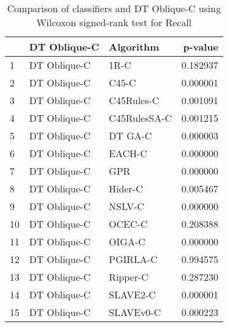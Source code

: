 \begin{table}
\footnotesize
\caption{Comparison of classifiers and DT Oblique-C using Wilcoxon signed-rank test for Recall}
\label{tab:DT Oblique-C wilcoxon Recall comparison}
\begin{tabular}{lllr}
\hline
 & DT Oblique-C & Algorithm & p-value \\
\hline
1 & DT Oblique-C & 1R-C & 0.182937 \\
2 & DT Oblique-C & C45-C & 0.000001 \\
3 & DT Oblique-C & C45Rules-C & 0.001091 \\
4 & DT Oblique-C & C45RulesSA-C & 0.001215 \\
5 & DT Oblique-C & DT GA-C & 0.000003 \\
6 & DT Oblique-C & EACH-C & 0.000000 \\
7 & DT Oblique-C & GPR & 0.000000 \\
8 & DT Oblique-C & Hider-C & 0.005467 \\
9 & DT Oblique-C & NSLV-C & 0.000000 \\
10 & DT Oblique-C & OCEC-C & 0.208388 \\
11 & DT Oblique-C & OIGA-C & 0.000000 \\
12 & DT Oblique-C & PGIRLA-C & 0.994575 \\
13 & DT Oblique-C & Ripper-C & 0.287230 \\
14 & DT Oblique-C & SLAVE2-C & 0.000001 \\
15 & DT Oblique-C & SLAVEv0-C & 0.000223 \\
\hline
\end{tabular}
\end{table}
